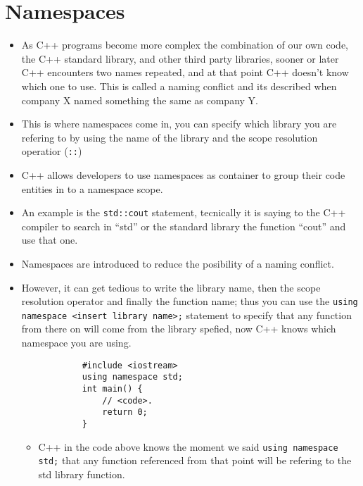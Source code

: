 \section{Namespaces}
\begin{itemize}
    \item As C++ programs become more complex the combination of our own code, the C++ standard library, and other third party libraries, sooner or later C++ encounters two names repeated, and at that point C++ doesn't know which one to use. This is called a naming conflict and its described when company X named something the same as company Y.
    \item This is where namespaces come in, you can specify which library you are refering to by using the name of the library and the scope resolution operatior (\verb|::|)
    \item C++ allows developers to use namespaces as container to group their code entities in to a namespace scope.
    \item An example is the \texttt{std::cout} statement, tecnically it is saying to the C++ compiler to search in ``std'' or the standard library the function ``cout'' and use that one.
    \item Namespaces are introduced to reduce the posibility of a naming conflict.
    \item However, it can get tedious to write the library name, then the scope resolution operator and finally the function name; thus you can use the \texttt{using namespace <insert library name>;} statement to specify that any function from there on will come from the library spefied, now C++ knows which namespace you are using.
        \begin{verbatim}
            #include <iostream> 
            using namespace std;
            int main() {
                // <code>.
                return 0;
            }
        \end{verbatim}
        \begin{itemize}
            \item C++ in the code above knows the moment we said \texttt{using namespace std;} that any function referenced from that point will be refering to the std library function.
        \end{itemize}
    

\end{itemize}
